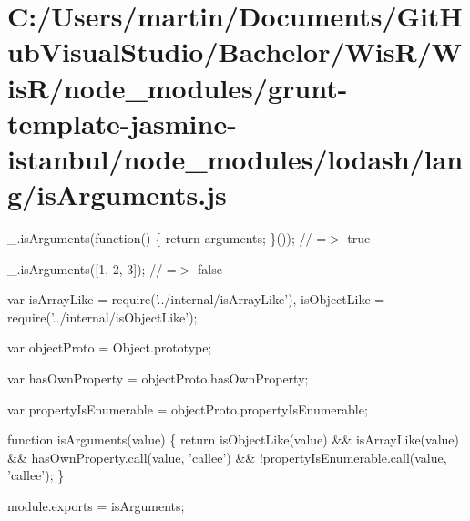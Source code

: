 \hypertarget{_c_1_2_users_2martin_2_documents_2_git_hub_visual_studio_2_bachelor_2_wis_r_2_wis_r_2node_module2709c268c9e8d5f946eb7f09d2d9877b}{}\section{C\+:/\+Users/martin/\+Documents/\+Git\+Hub\+Visual\+Studio/\+Bachelor/\+Wis\+R/\+Wis\+R/node\+\_\+modules/grunt-\/template-\/jasmine-\/istanbul/node\+\_\+modules/lodash/lang/is\+Arguments.\+js}
\+\_\+.\+is\+Arguments(function() \{ return arguments; \}()); // =$>$ true

\+\_\+.\+is\+Arguments(\mbox{[}1, 2, 3\mbox{]}); // =$>$ false


\begin{DoxyCodeInclude}
var isArrayLike = require(\textcolor{stringliteral}{'../internal/isArrayLike'}),
    isObjectLike = require(\textcolor{stringliteral}{'../internal/isObjectLike'});

var objectProto = Object.prototype;

var hasOwnProperty = objectProto.hasOwnProperty;

var propertyIsEnumerable = objectProto.propertyIsEnumerable;

\textcolor{keyword}{function} isArguments(value) \{
  \textcolor{keywordflow}{return} isObjectLike(value) && isArrayLike(value) &&
    hasOwnProperty.call(value, \textcolor{stringliteral}{'callee'}) && !propertyIsEnumerable.call(value, \textcolor{stringliteral}{'callee'});
\}

module.exports = isArguments;
\end{DoxyCodeInclude}
 